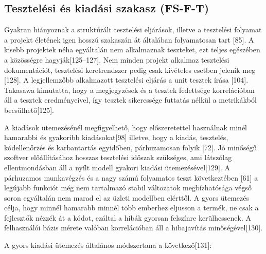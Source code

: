 \documentclass[12pt,magyar,a4paper,oneside]{scrreprt}
\begin{document}
\hypertarget{sec:FS-F-T}{%
\subsection{Tesztelési és kiadási szakasz (FS-F-T)}\label{sec:FS-F-T}}

Gyakran hiányoznak a struktúrált tesztelési eljárások, illetve a
tesztelési folyamat a projekt életének igen hosszú szakaszán át
általában folyamatosan tart {[}85{]}. A kisebb projektek néha egyáltalán
nem alkalmaznak teszteket, ezt teljes egészében a közösségre
hagyják{[}125--127{]}. Nem minden projekt alkalmaz tesztelési
dokumentációt, tesztelési keretrendszer pedig csak kivételes esetben
jelenik meg {[}128{]}. A legjellemzőbb alkalmazott tesztelési eljárás a
unit tesztek írása {[}104{]}. Takasawa kimutatta, hogy a megjegyzések és
a tesztek fedettsége korrelációban áll a tesztek eredményeivel, így
tesztek sikeressége futtatás nélkül a metrikákból becsülhető{[}125{]}.

A kiadások ütemezésénél megfigyelhető, hogy előszeretettel használnak
minél hamarabbi és gyakoribb kiadásokat{[}98{]} illetve, hogy a kiadás,
tesztelés, kódellenőrzés és karbantartás egyidőben, párhuzamosan folyik
{[}72{]}. Jó minőségű szoftver előállításához hosszas tesztelési időszak
szükséges, ami látszólag ellentmondásban áll a nyílt modell gyakori
kiadási ütemezésével{[}129{]}. A párhuzamos munkavégzés és a nagy számú
folyamatos teszt következtében {[}61{]} a legújabb funkciót még nem
tartalmazó stabil változatok megbízhatósága végső soron egyáltalán nem
marad el az üzleti modellben elérttől. A gyors ütemezés célja, hogy
minnél hamarabb minnél több emberhez eljusson a termék, ne csak a
fejlesztők nézzék át a kódot, ezáltal a hibák gyorsan felszínre
kerülhessenek. A felhasználói bázis mérete valóban korrelációban áll a
hibajavítás minőségével{[}130{]}.

A gyors kiadási ütemezés általános módszertana a következő{[}131{]}:
\end{document}
